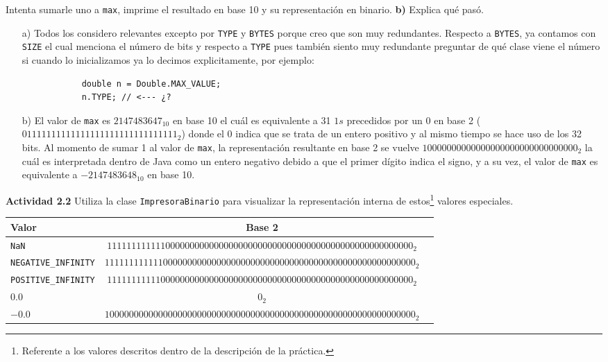 \documentclass[11pt,letterpaper]{article}
\begin{document}
Intenta sumarle uno a \texttt{max}, imprime el resultado en base 10 y su
representación en binario. \textbf{b)} Explica qué pasó.

\begin{enumerate}
    \item[a)] Todos los considero relevantes excepto por \texttt{TYPE} y \texttt{BYTES}
    porque creo que son muy redundantes. Respecto a \texttt{BYTES}, ya contamos con
    \texttt{SIZE} el cual menciona el número de bits y respecto a \texttt{TYPE} pues
    también siento muy redundante preguntar de qué clase viene el número si cuando
    lo inicializamos ya lo decimos explicitamente, por ejemplo:
        \begin{verbatim}
            double n = Double.MAX_VALUE;
            n.TYPE; // <--- ¿?
        \end{verbatim}

    \item[b)] El valor de \texttt{max} es $2147483647_{10}$ en base 10 el cuál es equivalente
    a 31 $1s$ precedidos por un $0$ en base 2 ($01111111111111111111111111111111_2$)
    donde el $0$ indica que se trata de un entero positivo y al mismo tiempo se hace uso
    de los 32 bits. Al momento de sumar 1 al valor de \texttt{max}, la representación
    resultante en base 2 se vuelve $10000000000000000000000000000000_2$ la cuál es
    interpretada dentro de Java como un entero negativo debido a que el primer dígito
    indica el signo, y a su vez, el valor de \texttt{max} es equivalente a $-2147483648_{10}$
    en base 10.
\end{enumerate}

\textbf{Actividad 2.2} Utiliza la clase \texttt{ImpresoraBinario} para visualizar
la representación interna de estos\footnote{Referente a los valores descritos
dentro de la descripción de la práctica.} valores especiales.

    \begin{center}
        \begin{tabular}{ l | c c }
        Valor & Base 2 \\
        \hline
        \texttt{NaN} & $111111111111000000000000000000000000000000000000000000000000000_2$ \\
        \texttt{NEGATIVE\_INFINITY} & $1111111111110000000000000000000000000000000000000000000000000000_2$ \\
        \texttt{POSITIVE\_INFINITY} & $111111111110000000000000000000000000000000000000000000000000000_2$ \\
        \texttt{$0.0$} & $0_2$ \\
        \texttt{$-0.0$} & $1000000000000000000000000000000000000000000000000000000000000000_2$
        \end{tabular}
    \end{center}
\end{document}
